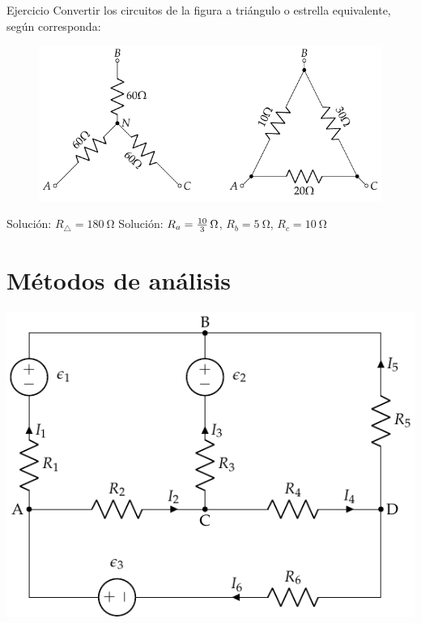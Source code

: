 \documentclass[aspectratio=169, xcolor={usenames,svgnames,dvipsnames}]{beamer}
\begin{document}

\begin{frame}{Ejercicio}
    \vspace{3mm}
    Convertir los circuitos de la figura a triángulo o estrella equivalente, según corresponda:
     \begin{figure}[H]
     	\centering
        \includegraphics{../figs/ej7_BT1.pdf}
     \end{figure}

    \vspace{5mm}
    \small{\hspace{29mm}\alert{Solución}: $R_{\triangle} = \qty{180}{\ohm}$ 
    \hspace{10mm}
    \alert{Solución}: $R_a = \frac{10}{3} \, \ohm$, $R_b = \qty{5}{\ohm}$, $R_c = \qty{10}{\ohm}$} 
\end{frame}


\section{Métodos de análisis}

\begin{frame}
    \begin{center}
    \includegraphics[height=0.95\textheight]{../figs/mallas1.pdf}
    \end{center}
\end{frame}
\end{document}
